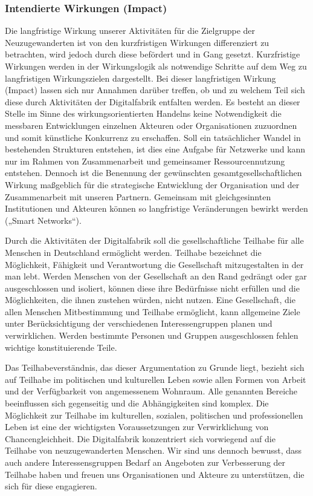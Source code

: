 \documentclass[12pt, a4paper]{article} %
\begin{document}
\hypertarget{intendierte-wirkungen-impact}{%
\subsubsection{Intendierte Wirkungen
(Impact)}\label{intendierte-wirkungen-impact}}

Die langfristige Wirkung unserer Aktivitäten für die Zielgruppe der
Neuzugewanderten ist von den kurzfristigen Wirkungen differenziert zu
betrachten, wird jedoch durch diese befördert und in Gang gesetzt.
Kurzfristige Wirkungen werden in der Wirkungslogik als notwendige
Schritte auf dem Weg zu langfristigen Wirkungszielen dargestellt. Bei
dieser langfristigen Wirkung (Impact) lassen sich nur Annahmen darüber
treffen, ob und zu welchem Teil sich diese durch Aktivitäten der
Digitalfabrik entfalten werden. Es besteht an dieser Stelle im Sinne des
wirkungsorientierten Handelns keine Notwendigkeit die messbaren
Entwicklungen einzelnen Akteuren oder Organisationen zuzuordnen und
somit künstliche Konkurrenz zu erschaffen. Soll ein tatsächlicher Wandel
in bestehenden Strukturen entstehen, ist dies eine Aufgabe für Netzwerke
und kann nur im Rahmen von Zusammenarbeit und gemeinsamer
Ressourcennutzung entstehen. Dennoch ist die Benennung der gewünschten
gesamtgesellschaftlichen Wirkung maßgeblich für die strategische
Entwicklung der Organisation und der Zusammenarbeit mit unseren
Partnern. Gemeinsam mit gleichgesinnten Institutionen und Akteuren
können so langfristige Veränderungen bewirkt werden („Smart Networks“).

Durch die Aktivitäten der Digitalfabrik soll die gesellschaftliche
Teilhabe für alle Menschen in Deutschland ermöglicht werden. Teilhabe
bezeichnet die Möglichkeit, Fähigkeit und Verantwortung die Gesellschaft
mitzugestalten in der man lebt. Werden Menschen von der Gesellschaft an
den Rand gedrängt oder gar ausgeschlossen und isoliert, können diese
ihre Bedürfnisse nicht erfüllen und die Möglichkeiten, die ihnen
zustehen würden, nicht nutzen. Eine Gesellschaft, die allen Menschen
Mitbestimmung und Teilhabe ermöglicht, kann allgemeine Ziele unter
Berücksichtigung der verschiedenen Interessengruppen planen und
verwirklichen. Werden bestimmte Personen und Gruppen ausgeschlossen
fehlen wichtige konstituierende Teile.

Das Teilhabeverständnis, das dieser Argumentation zu Grunde liegt,
bezieht sich auf Teilhabe im politischen und kulturellen Leben sowie
allen Formen von Arbeit und der Verfügbarkeit von angemessenem Wohnraum.
Alle genannten Bereiche beeinflussen sich gegenseitig und die
Abhängigkeiten sind komplex. Die Möglichkeit zur Teilhabe im
kulturellen, sozialen, politischen und professionellen Leben ist eine
der wichtigsten Voraussetzungen zur Verwirklichung von
Chancengleichheit. Die Digitalfabrik konzentriert sich vorwiegend auf
die Teilhabe von neuzugewanderten Menschen. Wir sind uns dennoch
bewusst, dass auch andere Interessensgruppen Bedarf an Angeboten zur
Verbesserung der Teilhabe haben und freuen uns Organisationen und
Akteure zu unterstützen, die sich für diese engagieren.
\end{document}
